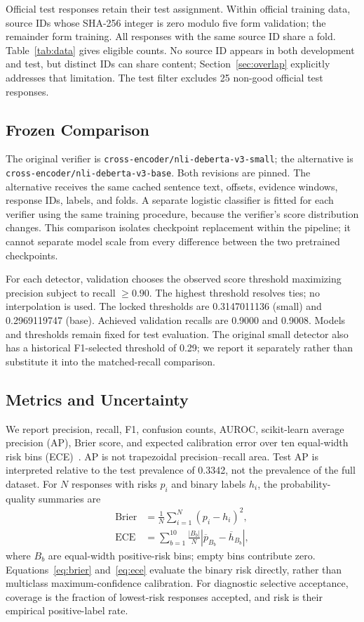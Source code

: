 \documentclass[conference,a4paper]{IEEEtran}
\begin{document}
Official test responses retain their test assignment. Within official training data, source IDs whose SHA-256 integer is zero modulo five form validation; the remainder form training. All responses with the same source ID share a fold. Table~\ref{tab:data} gives eligible counts. No source ID appears in both development and test, but distinct IDs can share content; Section~\ref{sec:overlap} explicitly addresses that limitation. The test filter excludes 25 non-good official test responses.



\subsection{Frozen Comparison}
The original verifier is \texttt{cross-encoder/nli-deberta-v3-small}; the alternative is \texttt{cross-encoder/nli-deberta-v3-base}. Both revisions are pinned. The alternative receives the same cached sentence text, offsets, evidence windows, response IDs, labels, and folds. A separate logistic classifier is fitted for each verifier using the same training procedure, because the verifier's score distribution changes. This comparison isolates checkpoint replacement within the pipeline; it cannot separate model scale from every difference between the two pretrained checkpoints.

For each detector, validation chooses the observed score threshold maximizing precision subject to recall $\geq0.90$. The highest threshold resolves ties; no interpolation is used. The locked thresholds are 0.3147011136 (small) and 0.2969119747 (base). Achieved validation recalls are 0.9000 and 0.9008. Models and thresholds remain fixed for test evaluation. The original small detector also has a historical F1-selected threshold of 0.29; we report it separately rather than substitute it into the matched-recall comparison.

\subsection{Metrics and Uncertainty}
We report precision, recall, F1, confusion counts, AUROC, scikit-learn average precision (AP), Brier score, and expected calibration error over ten equal-width risk bins (ECE)~\cite{sklearnmetrics,guocalibration}. AP is not trapezoidal precision--recall area. Test AP is interpreted relative to the test prevalence of 0.3342, not the prevalence of the full dataset. For $N$ responses with risks $p_i$ and binary labels $h_i$, the probability-quality summaries are
\begin{align}
\mathrm{Brier}&=\frac{1}{N}\sum_{i=1}^{N}(p_i-h_i)^2,\label{eq:brier}\\
\mathrm{ECE}&=\sum_{b=1}^{10}\frac{|B_b|}{N}\left|\overline{p}_{B_b}-\overline{h}_{B_b}\right|,\label{eq:ece}
\end{align}
where $B_b$ are equal-width positive-risk bins; empty bins contribute zero. Equations~\eqref{eq:brier} and~\eqref{eq:ece} evaluate the binary risk directly, rather than multiclass maximum-confidence calibration. For diagnostic selective acceptance, coverage is the fraction of lowest-risk responses accepted, and risk is their empirical positive-label rate.
\end{document}
